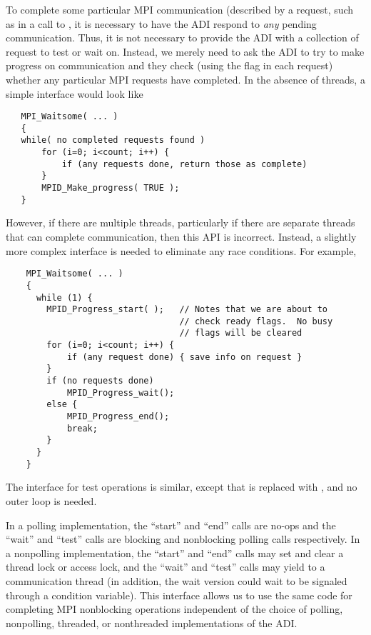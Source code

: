 To complete some particular MPI communication (described by a request,
such as in a call to , it is necessary to have the ADI
respond to \emph{any} pending communication.  Thus, it is not
necessary to provide the ADI with a collection of request to test or
wait on.  Instead, we merely need to ask the ADI to try to make
progress on communication and they check (using the  flag
in each request) whether any particular MPI requests have completed.
In the absence of threads, a simple interface would look like
\begin{verbatim}
   MPI_Waitsome( ... )
   {
   while( no completed requests found ) 
       for (i=0; i<count; i++) {
           if (any requests done, return those as complete)
       }
       MPID_Make_progress( TRUE );
   }
\end{verbatim}
However, if there are multiple threads, particularly if there are
separate threads that can complete communication, then this API is
incorrect.  Instead, a slightly more complex interface is needed to
eliminate any race conditions.  For example,
\begin{verbatim}
    MPI_Waitsome( ... )
    {
      while (1) {
        MPID_Progress_start( );   // Notes that we are about to
                                  // check ready flags.  No busy 
                                  // flags will be cleared
        for (i=0; i<count; i++) {
            if (any request done) { save info on request }
        }
        if (no requests done) 
            MPID_Progress_wait();
        else {
            MPID_Progress_end();
            break;
        }
      }
    }
\end{verbatim}
The interface for test operations is similar, except that
 is replaced with ,
and no outer loop is needed.

In a polling implementation, the ``start'' and ``end'' calls are
no-ops and the ``wait'' and ``test'' calls are blocking and
nonblocking polling calls respectively.  In a nonpolling
implementation, the ``start'' and ``end'' calls may set and clear a thread lock
or access lock, and the ``wait'' and ``test'' calls may yield to a
communication thread (in addition, the wait version could wait to be
signaled through a condition variable).  This interface allows us to
use the same code for completing MPI nonblocking operations
independent of the choice of polling, nonpolling, threaded, or
nonthreaded implementations of the ADI.

